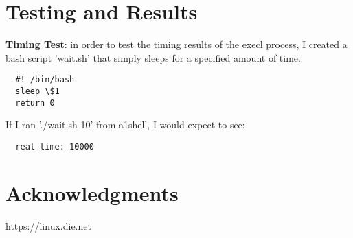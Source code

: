 \documentclass{article}
\begin{document}
\section{Testing and Results}
\textbf{Timing Test}:
in order to test the timing results of the execl process, I created a  bash script
'wait.sh' that simply sleeps for a specified amount of time.
\begin{verbatim}
  #! /bin/bash
  sleep \$1
  return 0
\end{verbatim}
If I ran './wait.sh 10' from a1shell, I would expect to see:
\begin{verbatim}
  real time: 10000
\end{verbatim}


\section{Acknowledgments}
https://linux.die.net
\end{document}
